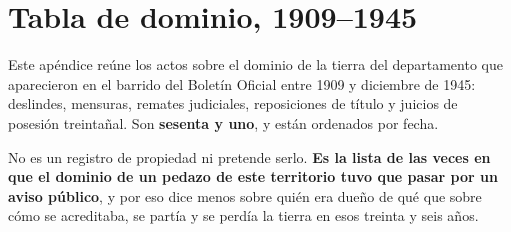 \chapter{Tabla de dominio, 1909--1945}
\label{cap:dominio}

Este apéndice reúne los actos sobre el dominio de la tierra del departamento que aparecieron
en el barrido del Boletín Oficial entre 1909 y diciembre de 1945: deslindes, mensuras,
remates judiciales, reposiciones de título y juicios de posesión treintañal. Son
\textbf{sesenta y uno}, y están ordenados por fecha.

No es un registro de propiedad ni pretende serlo. \textbf{Es la lista de las veces en que el
dominio de un pedazo de este territorio tuvo que pasar por un aviso público}, y por eso dice
menos sobre quién era dueño de qué que sobre cómo se acreditaba, se partía y se perdía la
tierra en esos treinta y seis años.

